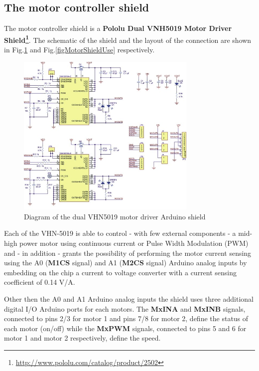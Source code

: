 \documentclass[12pt,a4,twoside]{article}
\begin{document}
\subsection{The motor controller shield}
The motor controller shield is a {\bf Pololu Dual VNH5019 Motor Driver Shield\footnote{\href{http://www.pololu.com/catalog/product/2502}{http://www.pololu.com/catalog/product/2502}}}. The schematic of the shield and the layout of the connection are shown in Fig.\ref{figMotorShield} and Fig.\ref{figMotorShieldUse} respectively.
\begin{figure}[b!]
\centering
\includegraphics[width=0.77\textwidth]{pololu_sch_small.png}
\caption{\label{figMotorShield} {Diagram of the dual VHN5019 motor driver Arduino shield}}
\end{figure}

Each of the VHN-5019 is able to control - with few external components - a mid-high power motor using continuous current or Pulse Width Modulation (PWM) and - in addition - grants the possibility of performing the motor current sensing using the A0 ({\bf M1CS} signal) and A1 ({\bf M2CS} signal) Arduino analog inputs by embedding on the chip a current to voltage converter with a current sensing coefficient of 0.14 V/A. 

Other then the A0 and A1 Arduino analog inputs the shield uses three additional digital I/O Arduino ports for each motors.
The {\bf MxINA} and {\bf MxINB} signals, connected to pins 2/3 for motor 1 and pins 7/8 for motor 2, define the status of each motor (on/off) while the {\bf MxPWM} signals, connected to pins 5 and 6 for motor 1 and motor 2 respectively, define the speed.
\end{document}
